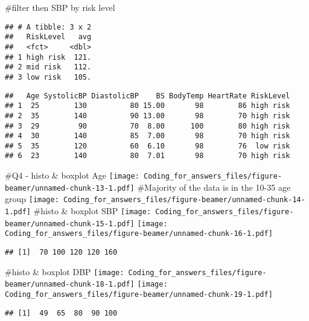 \documentclass[
  ignorenonframetext,
]{beamer}
\begin{document}
\begin{frame}[fragile]
\#filter then SBP by risk level

\begin{verbatim}
## # A tibble: 3 x 2
##   RiskLevel   avg
##   <fct>     <dbl>
## 1 high risk  121.
## 2 mid risk   112.
## 3 low risk   105.
\end{verbatim}

\begin{verbatim}
##   Age SystolicBP DiastolicBP    BS BodyTemp HeartRate RiskLevel
## 1  25        130          80 15.00       98        86 high risk
## 2  35        140          90 13.00       98        70 high risk
## 3  29         90          70  8.00      100        80 high risk
## 4  30        140          85  7.00       98        70 high risk
## 5  35        120          60  6.10       98        76  low risk
## 6  23        140          80  7.01       98        70 high risk
\end{verbatim}

\#Q4 - histo \& boxplot Age
\texttt{[image: Coding\_for\_answers\_files/figure-beamer/unnamed-chunk-13-1.pdf]}
\#Majority of the data is in the 10-35 age group
\texttt{[image: Coding\_for\_answers\_files/figure-beamer/unnamed-chunk-14-1.pdf]}
\#histo \& boxplot SBP
\texttt{[image: Coding\_for\_answers\_files/figure-beamer/unnamed-chunk-15-1.pdf]}
\texttt{[image: Coding\_for\_answers\_files/figure-beamer/unnamed-chunk-16-1.pdf]}

\begin{verbatim}
## [1]  70 100 120 120 160
\end{verbatim}

\#histo \& boxplot DBP
\texttt{[image: Coding\_for\_answers\_files/figure-beamer/unnamed-chunk-18-1.pdf]}
\texttt{[image: Coding\_for\_answers\_files/figure-beamer/unnamed-chunk-19-1.pdf]}

\begin{verbatim}
## [1]  49  65  80  90 100
\end{verbatim}
\end{frame}
\end{document}
